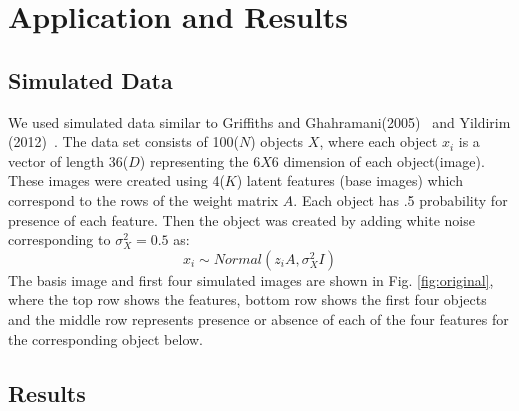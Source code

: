 \documentclass{article}
\begin{document}
\section{Application and Results}
\subsection{Simulated Data}
We used simulated data similar to Griffiths and Ghahramani(2005)~\cite{griffiths} and Yildirim (2012)~\cite{yildirim}. The data set consists of 100($N$) objects $X$, where each object $x_i$ is a vector of length 36($D$) representing the $6X6$ dimension of each object(image). These images were created using 4($K$) latent features (base images) which correspond to the rows of the weight matrix $A$. Each object has .5 probability for presence of each feature. Then the object was created by adding white noise corresponding to $\sigma_X^2=0.5$ as:
\[
x_i \sim Normal(z_iA, \sigma_X^2I)
\]
The basis image and first four simulated images are shown in Fig. \ref{fig:original}, where the top row shows the features, bottom row shows the first four objects and the middle row represents presence or absence of each of the four features for the corresponding object below.\\

\subsection{Results}
\end{document}
